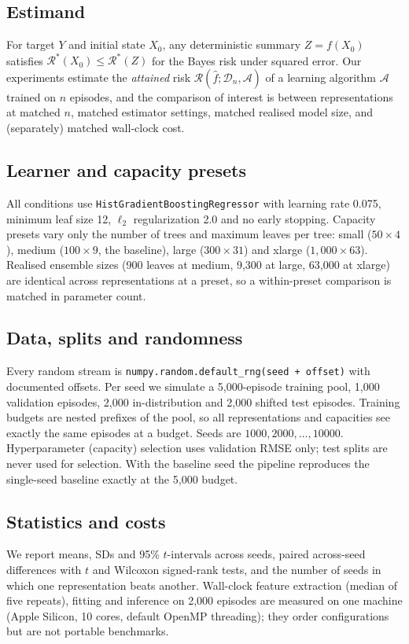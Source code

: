 \documentclass[11pt,a4paper]{article}
\begin{document}
\subsection{Estimand}\label{sec:estimand}
For target $Y$ and initial state $X_0$, any deterministic summary $Z=f(X_0)$
satisfies $\mathcal{R}^*(X_0)\le\mathcal{R}^*(Z)$ for the Bayes risk under
squared error. Our experiments estimate the \emph{attained} risk
$\mathcal{R}(\hat f;\mathcal{D}_n,\mathcal{A})$ of a learning algorithm
$\mathcal{A}$ trained on $n$ episodes, and the comparison of interest is between
representations at matched $n$, matched estimator settings, matched realised
model size, and (separately) matched wall-clock cost.

\subsection{Learner and capacity presets}
All conditions use \texttt{HistGradientBoostingRegressor} \citep{pedregosa2011}
with learning rate 0.075, minimum leaf size 12, $\ell_2$ regularization 2.0 and
no early stopping. Capacity presets vary only the number of trees and maximum
leaves per tree: small ($50\times4$), medium ($100\times9$, the baseline),
large ($300\times31$) and xlarge ($1{,}000\times63$). Realised ensemble sizes
(900 leaves at medium, 9,300 at large, 63,000 at xlarge) are identical across
representations at a preset, so a within-preset comparison is matched in
parameter count.

\subsection{Data, splits and randomness}
Every random stream is \texttt{numpy.random.default\_rng(seed + offset)} with
documented offsets. Per seed we simulate a 5,000-episode training pool, 1,000
validation episodes, 2,000 in-distribution and 2,000 shifted test episodes.
Training budgets are nested prefixes of the pool, so all representations and
capacities see exactly the same episodes at a budget. Seeds are
$1000,2000,\ldots,10000$. Hyperparameter (capacity) selection uses validation
RMSE only; test splits are never used for selection. With the baseline seed the
pipeline reproduces the single-seed baseline exactly at the 5,000 budget.

\subsection{Statistics and costs}
We report means, SDs and 95\% $t$-intervals across seeds, paired across-seed
differences with $t$ and Wilcoxon signed-rank tests, and the number of seeds in
which one representation beats another. Wall-clock feature extraction (median
of five repeats), fitting and inference on 2,000 episodes are measured on one
machine (Apple Silicon, 10 cores, default OpenMP threading); they order
configurations but are not portable benchmarks.
\end{document}
